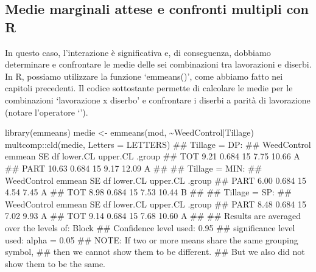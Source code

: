 \documentclass[a4paper,12pt,oneside]{book}
\newenvironment{Shaded}{\begin{snugshade}}{\end{snugshade}}
\newcommand{\SpecialCharTok}[1]{#1}
\newcommand{\DocumentationTok}[1]{#1}
\newcommand{\OtherTok}[1]{#1}
\newcommand{\FunctionTok}[1]{#1}
\newcommand{\AttributeTok}[1]{#1}
\newcommand{\AlertTok}[1]{#1}
\newcommand{\NormalTok}[1]{#1}
\begin{document}
\hypertarget{medie-marginali-attese-e-confronti-multipli-con-r}{%
\subsection{Medie marginali attese e confronti multipli con R}\label{medie-marginali-attese-e-confronti-multipli-con-r}}

In questo caso, l'interazione è significativa e, di conseguenza, dobbiamo determinare e confrontare le medie delle sei combinazioni tra lavorazioni e diserbi. In R, possiamo utilizzare la funzione `emmeans()', come abbiamo fatto nei capitoli precedenti. Il codice sottostante permette di calcolare le medie per le combinazioni `lavorazione x diserbo' e confrontare i diserbi a parità di lavorazione (notare l'operatore `\textbar{}').

\begin{Shaded}
\begin{Highlighting}[]
\FunctionTok{library}\NormalTok{(emmeans)}
\NormalTok{medie }\OtherTok{\textless{}{-}} \FunctionTok{emmeans}\NormalTok{(mod, }\SpecialCharTok{\textasciitilde{}}\NormalTok{WeedControl}\SpecialCharTok{|}\NormalTok{Tillage)}
\NormalTok{multcomp}\SpecialCharTok{::}\FunctionTok{cld}\NormalTok{(medie, }\AttributeTok{Letters =}\NormalTok{ LETTERS)}
\DocumentationTok{\#\# Tillage = DP:}
\DocumentationTok{\#\#  WeedControl emmean    SE df lower.CL upper.CL .group}
\DocumentationTok{\#\#  TOT           9.21 0.684 15     7.75    10.66  A    }
\DocumentationTok{\#\#  PART         10.63 0.684 15     9.17    12.09  A    }
\DocumentationTok{\#\# }
\DocumentationTok{\#\# Tillage = MIN:}
\DocumentationTok{\#\#  WeedControl emmean    SE df lower.CL upper.CL .group}
\DocumentationTok{\#\#  PART          6.00 0.684 15     4.54     7.45  A    }
\DocumentationTok{\#\#  TOT           8.98 0.684 15     7.53    10.44   B   }
\DocumentationTok{\#\# }
\DocumentationTok{\#\# Tillage = SP:}
\DocumentationTok{\#\#  WeedControl emmean    SE df lower.CL upper.CL .group}
\DocumentationTok{\#\#  PART          8.48 0.684 15     7.02     9.93  A    }
\DocumentationTok{\#\#  TOT           9.14 0.684 15     7.68    10.60  A    }
\DocumentationTok{\#\# }
\DocumentationTok{\#\# Results are averaged over the levels of: Block }
\DocumentationTok{\#\# Confidence level used: 0.95 }
\DocumentationTok{\#\# significance level used: alpha = 0.05 }
\DocumentationTok{\#\# }\AlertTok{NOTE}\DocumentationTok{: If two or more means share the same grouping symbol,}
\DocumentationTok{\#\#       then we cannot show them to be different.}
\DocumentationTok{\#\#       But we also did not show them to be the same.}
\end{Highlighting}
\end{Shaded}
\end{document}
